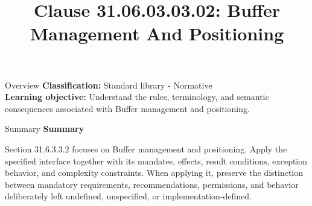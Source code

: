\documentclass[10pt,letterpaper]{article}
\title{Clause 31.06.03.03.02: Buffer Management And Positioning}
\author{}
\date{}
\begin{document}
\maketitle
\begin{CornellOverviewBox}{Overview}
\textbf{Classification:} Standard library - Normative\\[2pt]
\textbf{Learning objective:} Understand the rules, terminology, and semantic consequences associated with Buffer management and positioning.
\end{CornellOverviewBox}\begin{CornellSummaryBox}{Summary}
{\sffamily\bfseries\color{Accent} Summary}\par\vspace{3pt}Section 31.6.3.3.2 focuses on Buffer management and positioning. Apply the specified interface together with its mandates, effects, result conditions, exception behavior, and complexity constraints. When applying it, preserve the distinction between mandatory requirements, recommendations, permissions, and behavior deliberately left undefined, unspecified, or implementation-defined.
\end{CornellSummaryBox}
\end{document}
